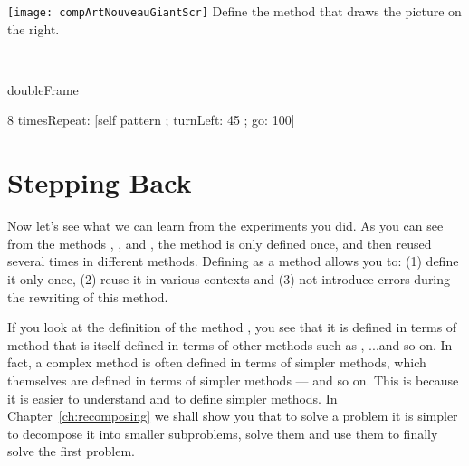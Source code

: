 

\begin{exofigwithsize}[0.5]{\texttt{[image: compArtNouveauGiantScr]}}
Define the method  that draws the picture on the right. 

\

\begin{nalltt}
doubleFrame

    8 timesRepeat: [self pattern ;
                                     turnLeft: 45 ;
                                     go: 100]
\end{nalltt}
\end{exofigwithsize}


\section{Stepping Back}
Now \newcommand{\replace}[2]{let us analyze what we learned}{let's see what we can learn} from the experiments you did. As you can see \newcommand{\replace}[2]{it with}{from} the methods , , and , the method  is only defined once, \newcommand{\replace}[2]{but}{and then} reused several times in different methods. Defining  as a method allows you to: (1) define it only
once, (2) reuse it in various contexts and (3) \newcommand{\remove}[1]{do} not introduce errors during the rewriting of this method. 

If you look at the definition of the method , you see that it is defined in terms of \newcommand{\add}[1]{the}  method that is itself defined in terms of other methods such as \go, \turnLeft...\newcommand{\add}[1]{ }and so on. In fact, a complex method is often defined in terms of simpler methods, which \newcommand{\replace}[2]{as well}{themselves} are defined in terms of \newcommand{\add}[1]{even} simpler methods \newcommand{\replace}[2]{too}{---} and so on. This is because it is \newcommand{\replace}[2]{simpler}{easier} to understand and to define simpler methods.  In Chapter~\ref{ch:recomposing} we shall show you that to solve a problem it is simpler to decompose it \newcommand{\replace}[2]{in terms of}{into} smaller subproblems, solve them and \newcommand{\add}[1]{then} use them to finally solve the first problem. 

